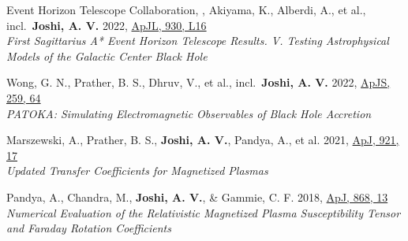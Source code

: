 \item Event Horizon Telescope Collaboration, , Akiyama, K., Alberdi, A., et al., incl.\ \textbf{Joshi, A. V.} 2022, \href{https://ui.adsabs.harvard.edu/abs/2022ApJ...930L..16E}{ApJL, 930, L16}\\\textit{First Sagittarius A* Event Horizon Telescope Results. V. Testing Astrophysical Models of the Galactic Center Black Hole}

\item Wong, G. N., Prather, B. S., Dhruv, V., et al., incl.\ \textbf{Joshi, A. V.} 2022, \href{https://ui.adsabs.harvard.edu/abs/2022ApJS..259...64W}{ApJS, 259, 64}\\\textit{PATOKA\@: Simulating Electromagnetic Observables of Black Hole Accretion}

\item Marszewski, A., Prather, B. S., \textbf{Joshi, A. V.}, Pandya, A., et al. 2021, \href{https://ui.adsabs.harvard.edu/abs/2021ApJ...921...17M}{ApJ, 921, 17}\\\textit{Updated Transfer Coefficients for Magnetized Plasmas}

\item Pandya, A., Chandra, M., \textbf{Joshi, A. V.}, \& Gammie, C. F. 2018, \href{https://ui.adsabs.harvard.edu/abs/2018ApJ...868...13P}{ApJ, 868, 13}\\\textit{Numerical Evaluation of the Relativistic Magnetized Plasma Susceptibility Tensor and Faraday Rotation Coefficients}

